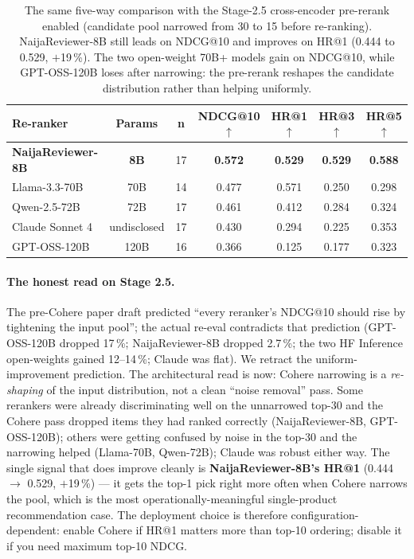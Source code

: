 \documentclass[sigconf,nonacm,balance]{acmart}
\begin{document}
\begin{table}[t]
\centering
\caption{The same five-way comparison with the Stage-2.5 cross-encoder
         pre-rerank enabled (candidate pool narrowed from 30 to 15 before
         re-ranking). NaijaReviewer-8B still leads on NDCG@10 and improves on
         HR@1 (0.444 to 0.529, $+$19\,\%). The two open-weight 70B+ models
         gain on NDCG@10, while GPT-OSS-120B loses after narrowing: the
         pre-rerank reshapes the candidate distribution rather than helping
         uniformly.}
\label{tab:taskB-5way-cohere}
\small
\begin{tabular}{lcccccc}
\toprule
\textbf{Re-ranker} & \textbf{Params} & \textbf{n} & \textbf{NDCG@10 $\uparrow$} &
\textbf{HR@1 $\uparrow$} & \textbf{HR@3 $\uparrow$} & \textbf{HR@5 $\uparrow$} \\
\midrule
\textbf{NaijaReviewer-8B} & \textbf{8B}  & 17 & \textbf{0.572} & \textbf{0.529} & \textbf{0.529} & \textbf{0.588} \\
Llama-3.3-70B             & 70B          & 14 & 0.477 & 0.571 & 0.250 & 0.298 \\
Qwen-2.5-72B              & 72B          & 17 & 0.461 & 0.412 & 0.284 & 0.324 \\
Claude Sonnet 4           & undisclosed  & 17 & 0.430 & 0.294 & 0.225 & 0.353 \\
GPT-OSS-120B              & 120B         & 16 & 0.366 & 0.125 & 0.177 & 0.323 \\
\bottomrule
\end{tabular}
\end{table}

\paragraph{The honest read on Stage 2.5.} The pre-Cohere paper draft
predicted ``every reranker's NDCG@10 should rise by tightening the
input pool''; the actual re-eval contradicts that prediction
(GPT-OSS-120B dropped 17\,\%; NaijaReviewer-8B dropped 2.7\,\%; the
two HF Inference open-weights gained 12--14\,\%; Claude was flat).
We retract the uniform-improvement prediction. The architectural
read is now: Cohere narrowing is a \emph{re-shaping} of the input
distribution, not a clean ``noise removal'' pass. Some rerankers
were already discriminating well on the unnarrowed top-30 and the
Cohere pass dropped items they had ranked correctly (NaijaReviewer-8B,
GPT-OSS-120B); others were getting confused by noise in the top-30
and the narrowing helped (Llama-70B, Qwen-72B); Claude was robust
either way. The single signal that does improve cleanly is
\textbf{NaijaReviewer-8B's HR@1} (0.444 $\to$ 0.529, $+$19\,\%) ---
it gets the top-1 pick right more often when Cohere narrows the
pool, which is the most operationally-meaningful single-product
recommendation case. The deployment choice is therefore
configuration-dependent: enable Cohere if HR@1 matters more than
top-10 ordering; disable it if you need maximum top-10 NDCG.
\end{document}
